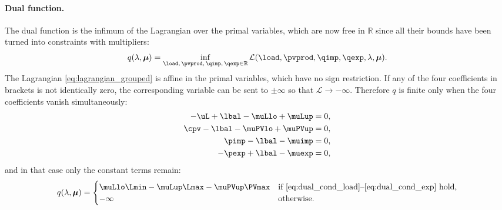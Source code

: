 \paragraph{Dual function.}
The dual function is the infimum of the Lagrangian over the primal variables, which are now
free in $\mathbb{R}$ since all their bounds have been turned into constraints with multipliers:
\begin{equation}
    q(\lambda, \boldsymbol{\mu}) = \inf_{\load,\, \pvprod,\, \qimp,\, \qexp \in \mathbb{R}}
    \mathcal{L}(\load, \pvprod, \qimp, \qexp, \lambda, \boldsymbol{\mu}).
\end{equation}
The Lagrangian \eqref{eq:lagrangian_grouped} is affine in the primal variables, which have
no sign restriction. If any of the four coefficients in brackets is not identically zero, the
corresponding variable can be sent to $\pm\infty$ so that $\mathcal{L} \to -\infty$.
Therefore $q$ is finite only when the four coefficients vanish simultaneously:
\begin{align}
    -\uL + \lbal - \muLlo + \muLup &= 0, \label{eq:dual_cond_load} \\
    \cpv - \lbal - \muPVlo + \muPVup &= 0, \label{eq:dual_cond_pv} \\
    \pimp - \lbal - \muimp &= 0, \label{eq:dual_cond_imp} \\
    -\pexp + \lbal - \muexp &= 0, \label{eq:dual_cond_exp}
\end{align}
and in that case only the constant terms remain:
\begin{equation}
    q(\lambda, \boldsymbol{\mu}) =
    \begin{cases}
        \muLlo \Lmin - \muLup \Lmax - \muPVup \PVmax
        & \text{if \eqref{eq:dual_cond_load}--\eqref{eq:dual_cond_exp} hold,} \\
        -\infty & \text{otherwise.}
    \end{cases}
\end{equation}

